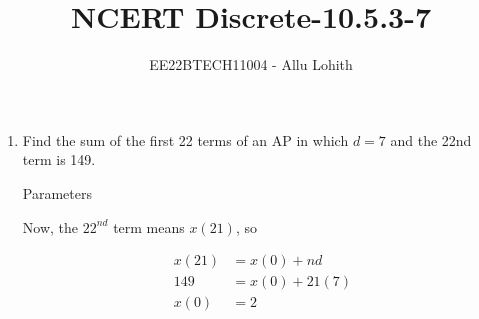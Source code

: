 \documentclass[journal,12pt,twocolumn]{IEEEtran}
\theoremstyle{remark}
\begin{document}

\vspace{3cm}

\title{NCERT Discrete-10.5.3-7}
\author{EE22BTECH11004 - Allu Lohith}

\maketitle
\newpage
\bigskip

\renewcommand{\thefigure}{\theenumi}
\renewcommand{\thetable}{\theenumi}
\begin{enumerate}
\item
Find the sum of the first 22 terms of an AP in which $d = 7$ and the 22nd term is 149.
\solution

\begin{table}[h!]
\centering

\vspace{0.5cm}
\caption{\normalsize Parameters}
\end{table}

Now, the $22^{nd}$ term means $x(21)$, so

\begin{align}
x(21) &= x(0)+nd\\
149 &= x(0)+21(7)\\
x(0) &= 2    
\end{align}


\end{enumerate}
\end{document}
